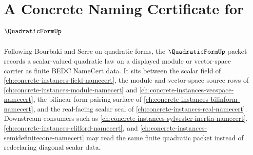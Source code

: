 \chapter{A Concrete Naming Certificate for $\QuadraticFormUp$}
\label{ch:concrete-instances-quadratic-form-namecert}

Following Bourbaki and Serre on quadratic forms, the $\QuadraticFormUp$ packet records a scalar-valued quadratic law on a displayed module or vector-space carrier as finite BEDC NameCert data. It sits between the scalar field of \autoref{ch:concrete-instances-field-namecert}, the module and vector-space source rows of \autoref{ch:concrete-instances-module-namecert} and \autoref{ch:concrete-instances-vecspace-namecert}, the bilinear-form pairing surface of \autoref{ch:concrete-instances-bilinform-namecert}, and the real-facing scalar seal of \autoref{ch:concrete-instances-real-namecert}. Downstream consumers such as \autoref{ch:concrete-instances-sylvester-inertia-namecert}, \autoref{ch:concrete-instances-clifford-namecert}, and \autoref{ch:concrete-instances-semidefinitecone-namecert} may read the same finite quadratic packet instead of redeclaring diagonal scalar data.

